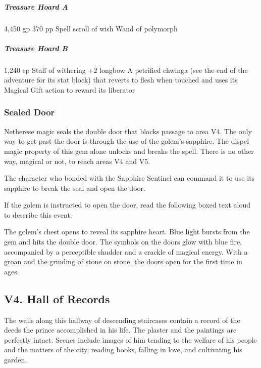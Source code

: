 \documentclass[10pt,a4paper,twoside,bg=print,twocolumn,openany,nodeprecatedcode]{dndbook}
\begin{document}
\begin{DndSidebar}[float=!b]{}

\begin{description}[nolistsep]
\subparagraph{Treasure Hoard A}
\item 4,450 gp 370 pp Spell scroll of wish Wand of polymorph
\end{description}




\begin{description}[nolistsep]
\subparagraph{Treasure Hoard B}
\item 1,240 ep Staff of withering +2 longbow A petrified chwinga (see the end of the adventure for its stat block) that reverts to flesh when touched and uses its Magical Gift action to reward its liberator
\end{description}



\end{DndSidebar}

\subsubsection{Sealed Door}
Netherese magic seals the double door that blocks passage to area V4. The only way to get past the door is through the use of the golem's sapphire. The dispel magic property of this gem alone unlocks and breaks the spell. There is no other way, magical or not, to reach areas V4 and V5.

The character who bonded with the Sapphire Sentinel can command it to use its sapphire to break the seal and open the door.

If the golem is instructed to open the door, read the following boxed text aloud to describe this event:

\begin{DndReadAloud}{}
The golem's chest opens to reveal its sapphire heart. Blue light bursts from the gem and hits the double door. The symbols on the doors glow with blue fire, accompanied by a perceptible shudder and a crackle of magical energy. With a groan and the grinding of stone on stone, the doors open for the first time in ages.

\end{DndReadAloud}

\subsection{V4. Hall of Records}
The walls along this hallway of descending staircases contain a record of the deeds the prince accomplished in his life. The plaster and the paintings are perfectly intact. Scenes include images of him tending to the welfare of his people and the matters of the city, reading books, falling in love, and cultivating his garden.
\end{document}
